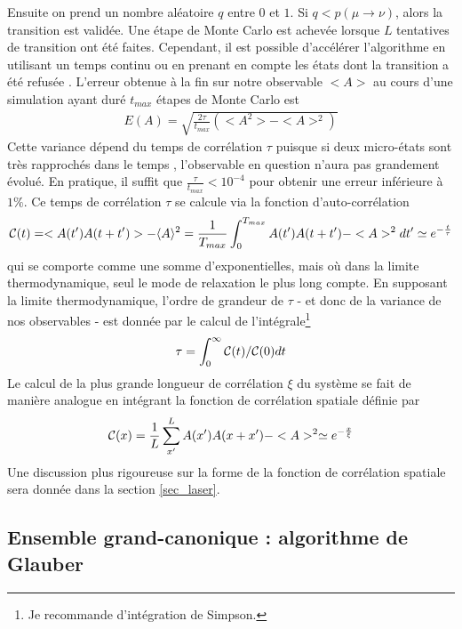 Ensuite on prend un nombre aléatoire $q$ entre $0$ et $1$. Si $q < p(\mu \rightarrow \nu)$, alors la transition est validée. Une étape de Monte Carlo est achevée lorsque $L$ tentatives de transition ont été faites. Cependant, il est possible d'accélérer l'algorithme en utilisant un temps continu \cite{newman_monte_1999} ou en prenant en compte les états dont la transition a été refusée \cite{frenkel_speed-up_2004}.
L'erreur obtenue à la fin sur notre observable $<A>$ au cours d'une simulation ayant duré $t_{max}$ étapes de Monte Carlo est 
\begin{align}
	E(A) = \sqrt{\frac{2 \tau}{t_{max}} (<A^2>-<A>^2)} 
\end{align}
Cette variance dépend du temps de corrélation $\tau$ puisque si deux micro-états sont très rapprochés dans le temps , l'observable en question n'aura pas grandement évolué. En pratique, il suffit que $\frac{\tau}{t_{max}} \less 10^{-4}$ pour obtenir une erreur inférieure à $1\%$. Ce temps de corrélation $\tau$ se calcule via la fonction d'auto-corrélation 
\begin{align}
\mathcal{C}(t) = <A(t')A(t+t')>-\langle A \rangle^2 = \frac{1}{T_{max}}\int_0^{T_{max}}A(t')A(t+t')-<A>^2 dt' \simeq e^{-\frac{t}{\tau}}
\end{align}
qui se comporte comme une somme d'exponentielles, mais où dans la limite thermodynamique, seul le mode de relaxation le plus long compte\cite{wansleben_monte_1991}. En supposant la limite thermodynamique, l'ordre de grandeur de $\tau$ - et donc de la variance de nos observables - est donnée par le calcul de l'intégrale\footnote{Je recommande d'intégration de Simpson.}
\begin{align}
	\tau = \int_0^{\infty} \mathcal{C}(t)/\mathcal{C}(0) dt
	\label{tau_cor}
\end{align}
Le calcul de la plus grande longueur de corrélation $\xi$ du système se fait de manière analogue en intégrant la fonction de corrélation spatiale définie par
\begin{align}
\mathcal{C}(x) = \frac{1}{L} \sum_{x'}^L A(x')A(x+x')-<A>^2 \simeq e^{-\frac{x}{\xi}}
\end{align}
Une discussion plus rigoureuse sur la forme de la fonction de corrélation spatiale sera donnée dans la section \ref{sec_laser}.

	\subsection{Ensemble grand-canonique : algorithme de Glauber}

